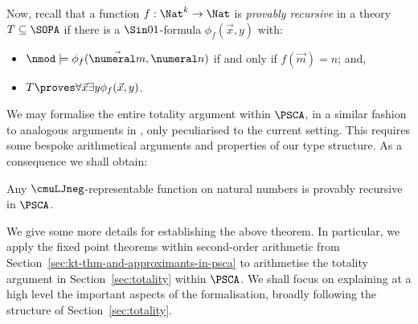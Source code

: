 

Now, recall that a function $f:\Nat^k \to \Nat$ is \emph{provably recursive} in a theory $T\subseteq \SOPA$ if there is a $\Sin 0 1 $-formula $\phi_f(\vec x,y)$ with:
\begin{itemize}
    \item $ \nmod \models \phi_f (\vec {\numeral m} , \numeral n) $ if and only if $f(\vec m) = n$; and,
    \item $T \proves \forall \vec x \exists y \phi_f (\vec x, y)$.
\end{itemize}

We may formalise the entire totality argument within $\PSCA$, in a similar fashion to analogous arguments in \cite{Das21:CT-fscd,KuperbergPP21systemT,Das21:CT-preprint}, only peculiarised to the current setting.
This requires some bespoke arithmetical arguments and properties of our type structure.
As a consequence we shall obtain:

\begin{theorem}
\label{thm:cmuLJneg-to-psca}
Any $\cmuLJneg$-representable function on natural numbers is provably recursive in $\PSCA$.
\end{theorem}


We give some more details for establishing the above theorem. In particular, we apply the fixed point theorems within second-order arithmetic from Section~\ref{sec:kt-thm-and-approximants-in-psca} to arithmetise the totality argument in Section~\ref{sec:totality} within $\PSCA$.
We shall focus on explaining at a high level the important aspects of the formalisation, broadly following the structure of Section~\ref{sec:totality}.




